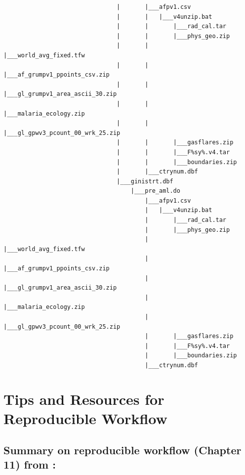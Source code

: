 \documentclass[]{book}
\begin{document}
\begin{verbatim}
                                |       |___afpv1.csv
                                |       |   |___v4unzip.bat
                                |       |       |___rad_cal.tar
                                |       |       |___phys_geo.zip
                                |       |       |___world_avg_fixed.tfw
                                |       |       |___af_grumpv1_ppoints_csv.zip
                                |       |       |___gl_grumpv1_area_ascii_30.zip
                                |       |       |___malaria_ecology.zip
                                |       |       |___gl_gpwv3_pcount_00_wrk_25.zip
                                |       |       |___gasflares.zip
                                |       |       |___F%sy%.v4.tar
                                |       |       |___boundaries.zip
                                |       |___ctrynum.dbf
                                |___ginistrt.dbf
                                    |___pre_aml.do
                                        |___afpv1.csv
                                        |   |___v4unzip.bat
                                        |       |___rad_cal.tar
                                        |       |___phys_geo.zip
                                        |       |___world_avg_fixed.tfw
                                        |       |___af_grumpv1_ppoints_csv.zip
                                        |       |___gl_grumpv1_area_ascii_30.zip
                                        |       |___malaria_ecology.zip
                                        |       |___gl_gpwv3_pcount_00_wrk_25.zip
                                        |       |___gasflares.zip
                                        |       |___F%sy%.v4.tar
                                        |       |___boundaries.zip
                                        |___ctrynum.dbf
\end{verbatim}

\hypertarget{tips-and-resources-for-reproducible-workflow}{%
\chapter{Tips and Resources for Reproducible Workflow}\label{tips-and-resources-for-reproducible-workflow}}

\hypertarget{summary-on-reproducible-workflow-chapter-11-from-christensen2019transparent}{%
\section{\texorpdfstring{Summary on reproducible workflow (Chapter 11) from \citet{christensen2019transparent}:}{Summary on reproducible workflow (Chapter 11) from @christensen2019transparent:}}\label{summary-on-reproducible-workflow-chapter-11-from-christensen2019transparent}}
\end{document}

